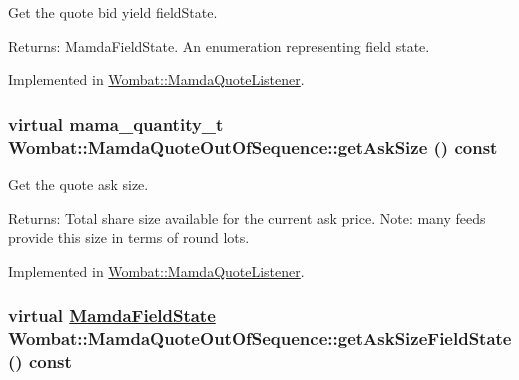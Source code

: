 Get the quote bid yield field\-State. 

\begin{Desc}
\item[Returns:]Mamda\-Field\-State. An enumeration representing field state. \end{Desc}


Implemented in \hyperlink{classWombat_1_1MamdaQuoteListener_28dd174c3b718a3def1d09b04ab68577}{Wombat::Mamda\-Quote\-Listener}.\hypertarget{classWombat_1_1MamdaQuoteOutOfSequence_4ce63ffd5bba87b803bb07ebceb53dc1}{
\subsubsection[getAskSize]{\setlength{\rightskip}{0pt plus 5cm}virtual mama\_\-quantity\_\-t Wombat::Mamda\-Quote\-Out\-Of\-Sequence::get\-Ask\-Size () const}}
\label{classWombat_1_1MamdaQuoteOutOfSequence_4ce63ffd5bba87b803bb07ebceb53dc1}


Get the quote ask size. 

\begin{Desc}
\item[Returns:]Total share size available for the current ask price. Note: many feeds provide this size in terms of round lots. \end{Desc}


Implemented in \hyperlink{classWombat_1_1MamdaQuoteListener_4808439461507148c55e678a3dffbb5d}{Wombat::Mamda\-Quote\-Listener}.\hypertarget{classWombat_1_1MamdaQuoteOutOfSequence_df0784fb2f32f6deec369c5f0fbc269b}{
\subsubsection[getAskSizeFieldState]{\setlength{\rightskip}{0pt plus 5cm}virtual \hyperlink{namespaceWombat_93aac974f2ab713554fd12a1fa3b7d2a}{Mamda\-Field\-State} Wombat::Mamda\-Quote\-Out\-Of\-Sequence::get\-Ask\-Size\-Field\-State () const}}
\label{classWombat_1_1MamdaQuoteOutOfSequence_df0784fb2f32f6deec369c5f0fbc269b}


